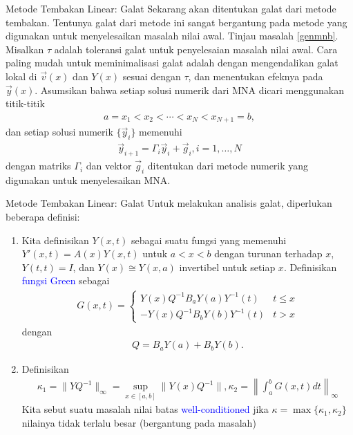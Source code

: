 \documentclass[xcolor={dvipsnames}, 9pt]{beamer}
\renewcommand{\emph}[1]{\textcolor{Blue}{#1}}
\begin{document}
	\begin{frame}{Metode Tembakan Linear: Galat}
		Sekarang akan ditentukan galat dari metode tembakan. Tentunya galat dari metode ini sangat bergantung pada metode yang digunakan untuk menyelesaikan masalah nilai awal. Tinjau masalah \eqref{genmnb}. \newline
		Misalkan $\tau$ adalah toleransi galat untuk penyelesaian masalah nilai awal. Cara paling mudah untuk meminimalisasi galat adalah dengan mengendalikan galat lokal di $\vec{v}(x)$ dan $Y(x)$ sesuai dengan $\tau$, dan menentukan efeknya pada $\vec{y}(x)$. \newline
		Asumsikan bahwa setiap solusi numerik dari MNA dicari menggunakan titik-titik
		\begin{align*}
			a = x_1 < x_2 < \cdots < x_N < x_{N+1} = b,
		\end{align*}
		dan setiap solusi numerik $\{\vec{y}_i\}$ memenuhi
		\begin{align}\label{discretescheme}
			\vec{y}_{i+1} = \Gamma_i\vec{y}_i + \vec{g}_i, i = 1,\dots, N
		\end{align}
		dengan matriks $\Gamma_i$ dan vektor $\vec{g}_i$ ditentukan dari metode numerik yang digunakan untuk menyelesaikan MNA.
	\end{frame}
	\begin{frame}{Metode Tembakan Linear: Galat}
		Untuk melakukan analisis galat, diperlukan beberapa definisi:
		\begin{definition}
			\begin{enumerate}
				\item Kita definisikan $Y(x,t)$ sebagai suatu fungsi yang memenuhi $Y'(x,t) = A(x)Y(x,t)$ untuk $a<x<b$ dengan turunan terhadap $x$, $Y(t,t) = I$, dan $Y(x) \cong Y(x,a)$ invertibel untuk setiap $x$. Definisikan \emph{fungsi Green} sebagai
				\begin{align*}
					G(x,t) = \begin{cases}
						Y(x)Q^{-1}B_aY(a)Y^{-1}(t) & t\leq x \\
						-Y(x)Q^{-1}B_bY(b)Y^{-1}(t) & t > x
					\end{cases}
				\end{align*}
				dengan
				\begin{align*}
					Q = B_aY(a) + B_bY(b).
				\end{align*}
				\item Definisikan
				\begin{align*}
					\kappa_1 = \|YQ^{-1}\|_\infty = \sup_{x\in [a,b]} \|Y(x)Q^{-1}\|, 
					\kappa_2 = \left\|\int_a^b G(x,t) dt\right\|_\infty
				\end{align*}
				Kita sebut suatu masalah nilai batas \emph{well-conditioned} jika $\kappa = \max\{\kappa_1,\kappa_2\}$ nilainya tidak terlalu besar (bergantung pada masalah)
			\end{enumerate}
		\end{definition}
	\end{frame}
\end{document}
